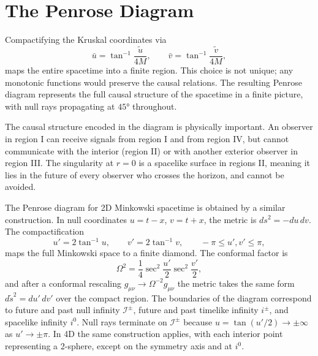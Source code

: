\section{The Penrose Diagram}

Compactifying the Kruskal coordinates via
\begin{equation}
	\bar u = \tan^{-1}\frac{\tilde u}{4M},
	\qquad \bar v = \tan^{-1}\frac{\tilde v}{4M},
\end{equation}
maps the entire spacetime into a finite region. This choice is not
unique; any monotonic functions would preserve the causal relations.
The resulting Penrose diagram represents the full causal structure of
the spacetime in a finite picture, with null rays propagating at
$45°$ throughout.


The causal structure encoded in the diagram is physically important.
An observer in region I can receive signals from region I and from
region IV, but cannot communicate with the interior (region II) or
with another exterior observer in region III. The singularity at $r=0$
is a spacelike surface in regions II, meaning it lies in the future of
every observer who crosses the horizon, and cannot be avoided.

The Penrose diagram for 2D Minkowski spacetime is obtained by a
similar construction. In null coordinates $u = t-x$, $v = t+x$, the
metric is $ds^2 = -du\,dv$. The compactification
\begin{equation}
	u' = 2\tan^{-1} u, \qquad v' = 2\tan^{-1} v,
	\qquad -\pi \leq u', v' \leq \pi,
\end{equation}
maps the full Minkowski space to a finite diamond. The conformal factor
is
\begin{equation}
	\Omega^2 = \frac{1}{4}\sec^2\!\frac{u'}{2}\sec^2\!\frac{v'}{2},
\end{equation}
and after a conformal rescaling $g_{\mu\nu}\to\Omega^{-2}g_{\mu\nu}$
the metric takes the same form $d\tilde s^2 = du'\,dv'$ over the
compact region. The boundaries of the diagram correspond to future and
past null infinity $\mathscr{I}^\pm$, future and past timelike infinity
$i^\pm$, and spacelike infinity $i^0$. Null rays terminate on
$\mathscr{I}^\pm$ because $u = \tan(u'/2)\to\pm\infty$ as
$u'\to\pm\pi$. In 4D the same construction applies, with each interior
point representing a 2-sphere, except on the symmetry axis and at $i^0$.


